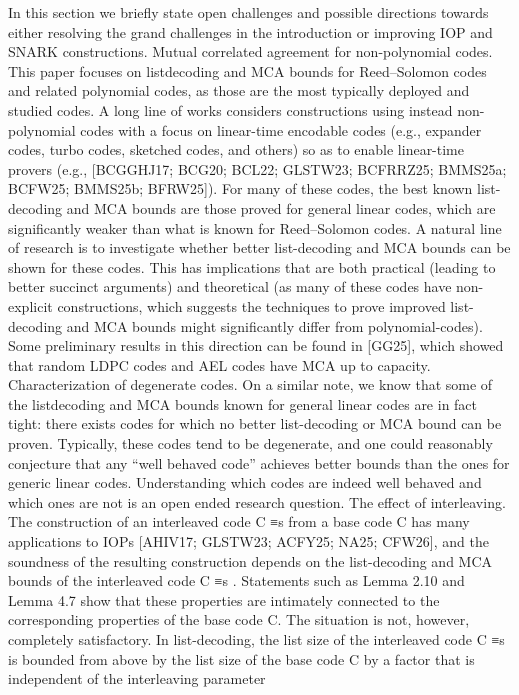 \documentclass[11pt]{article}
\begin{document}
In this section we briefly state open challenges and possible directions towards either resolving the
grand challenges in the introduction or improving IOP and SNARK constructions.
Mutual correlated agreement for non-polynomial codes. This paper focuses on listdecoding and MCA bounds for Reed–Solomon codes and related polynomial codes, as those are the
most typically deployed and studied codes. A long line of works considers constructions using instead non-polynomial codes with a focus on linear-time encodable codes (e.g., expander codes, turbo
codes, sketched codes, and others) so as to enable linear-time provers (e.g., [BCGGHJ17; BCG20;
BCL22; GLSTW23; BCFRRZ25; BMMS25a; BCFW25; BMMS25b; BFRW25]). For many of these
codes, the best known list-decoding and MCA bounds are those proved for general linear codes,
which are significantly weaker than what is known for Reed–Solomon codes. A natural line of research is to investigate whether better list-decoding and MCA bounds can be shown for these codes.
This has implications that are both practical (leading to better succinct arguments) and theoretical
(as many of these codes have non-explicit constructions, which suggests the techniques to prove
improved list-decoding and MCA bounds might significantly differ from polynomial-codes). Some
preliminary results in this direction can be found in [GG25], which showed that random LDPC
codes and AEL codes have MCA up to capacity.
Characterization of degenerate codes. On a similar note, we know that some of the listdecoding and MCA bounds known for general linear codes are in fact tight: there exists codes
for which no better list-decoding or MCA bound can be proven. Typically, these codes tend to
be degenerate, and one could reasonably conjecture that any “well behaved code” achieves better
bounds than the ones for generic linear codes. Understanding which codes are indeed well behaved
and which ones are not is an open ended research question.
The effect of interleaving. The construction of an interleaved code C ≡s from a base code C has
many applications to IOPs [AHIV17; GLSTW23; ACFY25; NA25; CFW26], and the soundness of
the resulting construction depends on the list-decoding and MCA bounds of the interleaved code
C ≡s . Statements such as Lemma 2.10 and Lemma 4.7 show that these properties are intimately
connected to the corresponding properties of the base code C. The situation is not, however,
completely satisfactory. In list-decoding, the list size of the interleaved code C ≡s is bounded from
above by the list size of the base code C by a factor that is independent of the interleaving parameter
\end{document}

